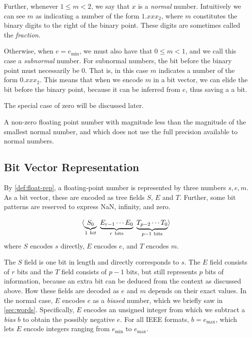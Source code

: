 Further, whenever $1 \leq m < 2$, we say that $x$ is a \emph{normal}
number.  Intuitively we can see $m$ as indicating a number of the form
$1.xxx_{2}$, where $m$ constitutes the binary digits to the right of
the binary point.  These digits are sometimes called the
\emph{fraction}.

Otherwise, when $e=e_{\text{min}}$, we must also have that
$0 \leq m < 1$, and we call this case a \emph{subnormal} number. For
subnormal numbers, the bit before the binary point must necessarily be
0. That is, in this case $m$ indicates a number of the form
$0.xxx_{2}$. This means that when we encode $m$ in a bit vector, we
can elide the bit before the binary point, because it can be inferred
from $e$, thus saving a a bit.

The special case of zero will be discussed later.

\begin{definition}
  A non-zero floating point number with magnitude less than the
  magnitude of the smallest normal number, and which does not use the
  full precision available to normal numbers.
\end{definition}

\subsection{Bit Vector Representation}
\label{sec:float-bits}

By \cref{def:float-rep}, a floating-point number is represented by
three numbers $s,e,m$.  As a bit vector, these are encoded as tree
fields $S$, $E$ and $T$.  Further, some bit patterns are reserved to
express NaN, infinity, and zero.

\begin{definition}
  \[
    \langle \underbrace{S_{0}}_{1~bit}~\underbrace{E_{r-1}\cdots{E_{0}}}_{r~\text{bits}}~\underbrace{T_{p-2}\cdots{}T_{0}}_{p-1~\text{bits}} \rangle
  \]
  where $S$ encodes $s$ directly, $E$ encodes $e$, and $T$ encodes
  $m$.
  \label{def:float-fields}
\end{definition}

The $S$ field is one bit in length and directly corresponds to $s$.
The $E$ field consists of $r$ bits and the $T$ field consists of
$p-1$ bits, but still represents $p$ bits of information, because an
extra bit can be deduced from the context as discussed above. How
these fields are decoded as $e$ and $m$ depends on their exact values.
In the normal case, $E$ encodes $e$ as a \emph{biased} number, which
we briefly saw in \cref{sec:words}.  Specifically, $E$ encodes an
unsigned integer from which we subtract a \emph{bias} $b$ to obtain
the possibly negative $e$.  For all IEEE formats, $b=e_{\text{max}}$,
which lets $E$ encode integers ranging from $e_{\text{min}}$ to
$e_{\text{max}}$.

